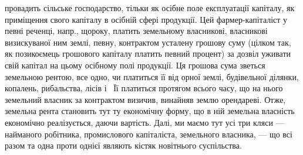 \parcont{}  %
провадить сільське господарство, тільки як осібне поле експлуатації капіталу, як
приміщення свого капіталу в осібній сфері продукції. Цей фармер-капіталіст у
певні реченці, напр., щороку, платить земельному власникові, власникові визискуваної
ним землі, певну, контрактом усталену грошову суму (цілком так, як позикоємець
грошового капіталу платить певний процент) за дозвіл уживати свій капітал
на цьому осібному полі продукції. Ця грошова сума зветься земельною рентою,
все одно, чи платиться її від орної землі, будівельної ділянки, копалень, рибальства,
лісів і~ Її платиться протягом всього часу, що на нього земельний
власник за контрактом визичив, винайняв землю орендареві. Отже, земельна
рента становить тут ту економічну форму, що в ній земельна власність економічно
реалізується, даючи вартість. Далі, ми маємо тут усі три кляси — найманого
робітника, промислового капіталіста, земельного власника, — що всі разом
та одна проти однієї являють кістяк новітнього суспільства.

